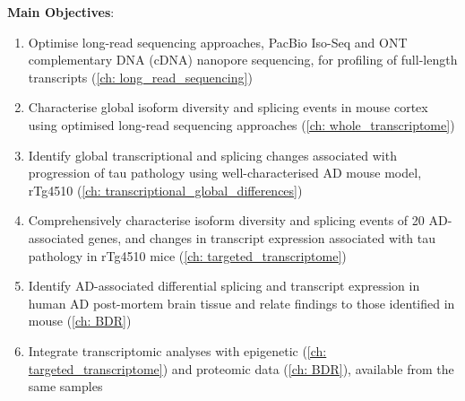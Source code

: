 \textbf{Main Objectives}:

\begin{enumerate}[]
	\item Optimise long-read sequencing approaches, PacBio Iso-Seq and ONT complementary DNA (cDNA) nanopore sequencing, for profiling of full-length transcripts (\cref{ch: long_read_sequencing}) 
	\item Characterise global isoform diversity and splicing events in mouse cortex using optimised long-read sequencing approaches (\cref{ch: whole_transcriptome}) 
	\item Identify global transcriptional and splicing changes associated with progression of tau pathology using well-characterised AD mouse model, rTg4510 (\cref{ch: transcriptional_global_differences})
	\item Comprehensively characterise isoform diversity and splicing events of 20 AD-associated genes, and changes in transcript expression associated with tau pathology in rTg4510 mice (\cref{ch: targeted_transcriptome})
	\item Identify AD-associated differential splicing and transcript expression in human AD post-mortem brain tissue and relate findings to those identified in mouse (\cref{ch: BDR})
	\item Integrate transcriptomic analyses with epigenetic (\cref{ch: targeted_transcriptome}) and proteomic data (\cref{ch: BDR}), available from the same samples
\end{enumerate}


